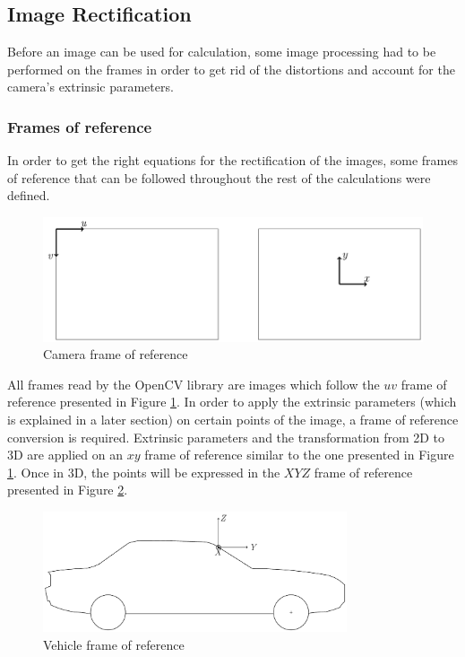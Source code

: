 \subsection{Image Rectification}
Before an image can be used for calculation, some image processing had to be performed on the frames in order to get rid of the distortions and account for the camera's extrinsic parameters. 

\subsubsection{Frames of reference}
In order to get the right equations for the rectification of the images, some frames of reference that can be followed throughout the rest of the calculations were defined.

\begin{figure}[H]
    \centering
    \includegraphics[width = \textwidth]{Figures/camera_coordinate_frame.pdf}
    \caption{Camera frame of reference}
    \label{fig:img_FOR}
\end{figure}

All frames read by the OpenCV library are images which follow the $uv$ frame of reference presented in Figure \ref{fig:img_FOR}. In order to apply the extrinsic parameters (which is explained in a later section) on certain points of the image, a frame of reference conversion is required. Extrinsic parameters and the transformation from 2D to 3D are applied on an $xy$ frame of reference similar to the one presented in Figure \ref{fig:img_FOR}. Once in 3D, the points will be expressed in the $XYZ$ frame of reference presented in Figure \ref{fig:vehicle_FOR}.

\begin{figure}[H]
    \centering
    \includegraphics[width = 0.8\textwidth]{Figures/V_FBD.pdf}
    \caption{Vehicle frame of reference}
    \label{fig:vehicle_FOR}
\end{figure}



